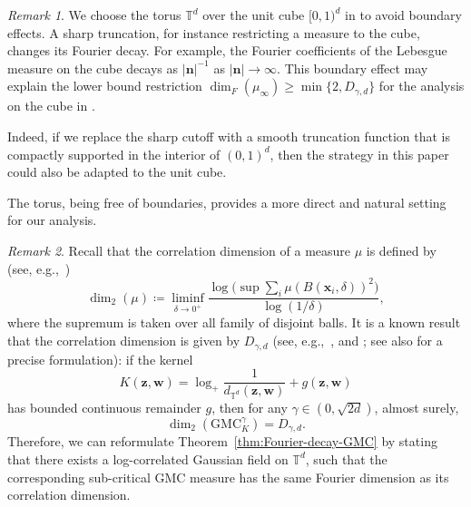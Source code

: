 \documentclass[12pt]{amsart}
\theoremstyle{definition}
\theoremstyle{remark}
\newtheorem*{remark*}{Remark}
\newcommand{\bz}{\boldsymbol{z}}
\newcommand{\bw}{\boldsymbol{w}}
\newcommand{\T}{\mathbb{T}}
\newcommand{\GMC}{\mathrm{GMC}}
\numberwithin{equation}{section}
\begin{document}
\begin{remark*}
We choose the torus $\mathbb{T}^d$ over the unit cube $[0,1)^d$ in \cite{LQT24,LQT25} to avoid boundary effects. A sharp truncation, for instance restricting a measure to the cube, changes its Fourier decay. For example, the Fourier coefficients of the Lebesgue measure on the cube decays as $|\boldsymbol{n}|^{-1}$ as $|\boldsymbol{n}|\to\infty$. This boundary effect may explain the lower bound restriction $\dim_F(\mu_\infty) \ge \min\{2, D_{\gamma,d}\}$ for the analysis on the cube in \cite[Theorem~1.2]{LQT25}.

Indeed, if we replace the sharp cutoff with a smooth truncation function that is compactly supported in the interior of $(0,1)^d$, then the strategy in this paper could also be adapted to the unit cube. 

The torus, being free of boundaries, provides a more direct and natural setting for our analysis.
\end{remark*}

\begin{remark*}
Recall that the correlation dimension of a measure $\mu$ is defined by (see, e.g.,~\cite[Lemma~2.6.6 and Definition~2.6.7]{BSS23})
\[
\dim_2(\mu)\coloneq \liminf_{\delta\to 0^+}\frac{\log \big(\sup\sum_i \mu(B(\boldsymbol{x}_i,\delta))^2\big)}{\log(1/\delta)},
\]
where the supremum is taken over all family of disjoint balls. It is a known result that the correlation dimension is given by $D_{\gamma,d}$ (see, e.g.,~\cite[Theorem~3.1 and Formula(3.2)]{Ber23}, \cite[Section~4.2]{RV14} and \cite[Remark~2]{GV23}; see also \cite[Lemma~3.6]{LQT25} for a precise formulation):  if the kernel
\[
K(\bz,\bw)=\log_+ \frac{1}{d_{\T^d}(\bz,\bw)}+g(\bz,\bw)
\]
has bounded continuous remainder $g$, then for any $\gamma\in (0, \sqrt{2d})$, almost surely, 
\[
\dim_2(\GMC_K^\gamma)=D_{\gamma,d}.
\]
Therefore, we can reformulate Theorem~\ref{thm:Fourier-decay-GMC} by stating that there exists a log-correlated Gaussian field on $\T^d$, such that the corresponding sub-critical GMC measure has the same Fourier dimension as its correlation dimension.
\end{remark*}
\end{document}
